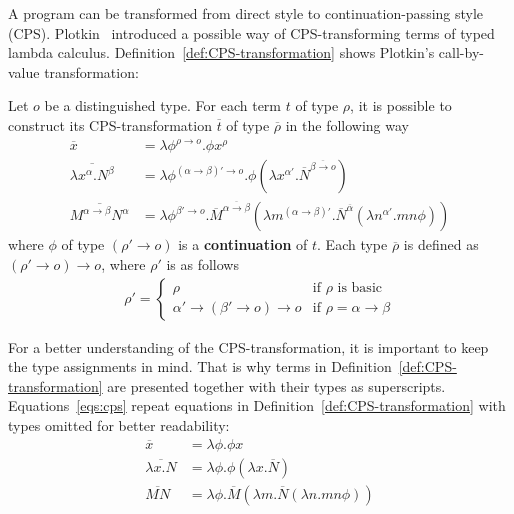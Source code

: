 A program can be transformed from direct style to continuation-passing style (CPS).
Plotkin~\cite{Plotkin:1975:Call-by-Name-Call-by-Value-and-the-lambda-Calculus} introduced a possible way of CPS-transforming terms of typed lambda calculus. Definition~\ref{def:CPS-transformation} shows Plotkin's call-by-value transformation: 
\begin{definition}\label{def:CPS-transformation} Let $o$ be a distinguished type. For each term $t$ of type $\rho$, it is possible to construct its CPS-transformation $\overline{t}$ of type $\overline{\rho}$ in the following way
%
\begin{align*}
\overline{x} & = \lambda \phi^{\rho \rightarrow o}. \phi x^{\rho}  \\
\overline{\lambda x^{\alpha}.N^{\beta}} & = \lambda \phi^{(\alpha \rightarrow \beta)' \rightarrow o}. \phi  (\lambda x^{\alpha'}. \overline{N}^{\overline{\beta \rightarrow o}}) \\
\overline{M^{\alpha \rightarrow \beta}N^\alpha} & = \lambda \phi^{\beta' \rightarrow o}. \overline{M}^{\overline{\alpha \rightarrow \beta} }(\lambda m^{(\alpha \rightarrow \beta)'}. \overline{N}^{\overline{\alpha}}(\lambda n^{\alpha'}.mn \phi)) 
\end{align*}
%
where $\phi$ of type $(\rho' \rightarrow o)$ is a \textbf{continuation} of $t$. Each type  $\overline{\rho}$ is defined as $(\rho' \rightarrow o) \rightarrow o$, where $\rho'$ is as follows
%
\begin{align*}
\rho' = \left\{
\begin{array}{rl} 
\rho & \text{if } \rho \text{ is basic}\\
{\alpha'} \rightarrow ({\beta}' \rightarrow o) \rightarrow o & \text{if } \rho = \alpha \rightarrow \beta \end{array} \right.
\end{align*}
\end{definition}

For a better understanding of the CPS-transformation, it is important to keep the type assignments in mind. That is why terms in Definition~\ref{def:CPS-transformation} are presented together with their types as superscripts. Equations~\eqref{eqs:cps} repeat equations in Definition~\ref{def:CPS-transformation} with types omitted for better readability:
%
\begin{subequations}
\begin{align}
\overline{x} & = \lambda \phi. \phi x \label{eq:var}  \\
\overline{\lambda x.N} & = \lambda \phi. \phi (\lambda x. \overline{N}) \label{eq:abst}\\
\overline{MN} & = \lambda \phi. \overline{M}(\lambda m. \overline{N}(\lambda n.mn \phi)) \label{eq:app}
\end{align} \label{eqs:cps}
\end{subequations}


